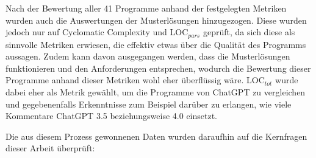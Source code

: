 \documentclass[class=scrbook, crop=false]{standalone}
\begin{document}
    Nach der Bewertung aller 41 Programme anhand der festgelegten Metriken wurden auch die Auswertungen der Musterlösungen hinzugezogen.
    Diese wurden jedoch nur auf Cyclomatic Complexity und LOC$_{pars}$ geprüft, da sich diese als sinnvolle Metriken erwiesen, die effektiv etwas über die
    Qualität des Programms aussagen.
    Zudem kann davon ausgegangen werden, dass die Musterlösungen funktionieren und den Anforderungen entsprechen, wodurch die Bewertung dieser Programme anhand
    dieser Metriken wohl eher überflüssig wäre.
    LOC$_{tot}$ wurde dabei eher als Metrik gewählt, um die Programme von ChatGPT zu vergleichen und gegebenenfalls Erkenntnisse zum Beispiel darüber zu erlangen,
    wie viele Kommentare ChatGPT 3.5 beziehungsweise 4.0 einsetzt.

    Die aus diesem Prozess gewonnenen Daten wurden daraufhin auf die Kernfragen dieser Arbeit überprüft:
\end{document}
